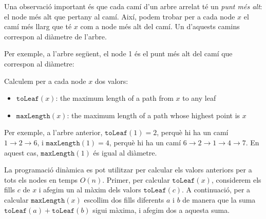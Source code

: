 Una observació important és que cada camí d'un arbre arrelat té un
\emph{punt més alt}: el node més alt que pertany al camí. Així, podem
trobar per a cada node $x$ el camí més llarg que té $x$ com a node més alt
del camí. Un d'aquests camins correspon al diàmetre de l'arbre.

Per exemple, a l'arbre següent, el node 1 és el punt més alt del camí
que correspon al diàmetre:
\begin{center}
\end{center}


Calculem per a cada node $x$ dos valors:
\begin{itemize}
\item $\texttt{toLeaf}(x)$: the maximum length of a path from $x$ to any leaf
\item $\texttt{maxLength}(x)$: the maximum length of a path
whose highest point is $x$
\end{itemize}
Per exemple, a l'arbre anterior, $\texttt{toLeaf}(1)=2$, perquè hi ha
un camí $1 \rightarrow 2 \rightarrow 6$, i $\texttt{maxLength}(1)=4$,
perquè hi ha un camí $6 \rightarrow 2 \rightarrow 1 \rightarrow 4
\rightarrow 7$. En aquest cas, $\texttt{maxLength}(1)$ és igual al
diàmetre.

La programació dinàmica es pot utilitzar per calcular els valors
anteriors per a tots els nodes en temps $O(n)$. Primer, per calcular
$\texttt{toLeaf}(x)$, considerem els fills $c$ de $x$ i afegim un al
màxim dels valors $\texttt{toLeaf}(c)$. A continuació, per a calcular
$\texttt{maxLength}(x)$ escollim dos fills diferents $a$ i $b$ de
manera que la suma $\texttt{toLeaf}(a)+\texttt{toLeaf}(b)$ sigui
màxima, i afegim dos a aquesta suma.

